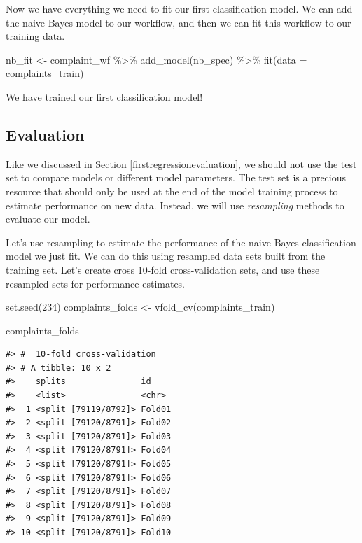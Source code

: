 \documentclass[
]{krantz}
\makeatletter
\newenvironment{Shaded}{\begin{snugshade}}{\end{snugshade}}
\newcommand{\AttributeTok}[1]{\textcolor[rgb]{0.77,0.63,0.00}{#1}}
\newcommand{\DecValTok}[1]{\textcolor[rgb]{0.00,0.00,0.81}{#1}}
\newcommand{\FunctionTok}[1]{\textcolor[rgb]{0.00,0.00,0.00}{#1}}
\newcommand{\NormalTok}[1]{#1}
\newcommand{\OtherTok}[1]{\textcolor[rgb]{0.56,0.35,0.01}{#1}}
\newcommand{\SpecialCharTok}[1]{\textcolor[rgb]{0.00,0.00,0.00}{#1}}
\newenvironment{kframe}{%
\medskip{}
\setlength{\fboxsep}{.8em}
 \def\at@end@of@kframe{}%
 \ifinner\ifhmode%
  \def\at@end@of@kframe{\end{minipage}}%
  \begin{minipage}{\columnwidth}%
 \fi\fi%
 \def\FrameCommand##1{\hskip\@totalleftmargin \hskip-\fboxsep
 \colorbox{shadecolor}{##1}\hskip-\fboxsep
     \hskip-\linewidth \hskip-\@totalleftmargin \hskip\columnwidth}%
 \MakeFramed {\advance\hsize-\width
   \@totalleftmargin\z@ \linewidth\hsize
   \@setminipage}}%
 {\par\unskip\endMakeFramed%
 \at@end@of@kframe}
\renewenvironment{Shaded}{\begin{kframe}}{\end{kframe}}
\makeatother
\begin{document}
Now we have everything we need to fit our first classification model. We can add the naive Bayes model to our workflow, and then we can fit this workflow to our training data.

\begin{Shaded}
\begin{Highlighting}[]
\NormalTok{nb\_fit }\OtherTok{\textless{}{-}}\NormalTok{ complaint\_wf }\SpecialCharTok{\%\textgreater{}\%}
  \FunctionTok{add\_model}\NormalTok{(nb\_spec) }\SpecialCharTok{\%\textgreater{}\%}
  \FunctionTok{fit}\NormalTok{(}\AttributeTok{data =}\NormalTok{ complaints\_train)}
\end{Highlighting}
\end{Shaded}

We have trained our first classification model!

\hypertarget{evaluation}{%
\subsection{Evaluation}\label{evaluation}}

Like we discussed in Section \ref{firstregressionevaluation}, we should not use the test set to compare models or different model parameters. The test set is a precious resource that should only be used at the end of the model training process to estimate performance on new data. Instead, we will use \emph{resampling} methods to evaluate our model.

Let's use resampling to estimate the performance of the naive Bayes classification model we just fit. We can do this using resampled data sets built from the training set. Let's create cross 10-fold cross-validation sets, and use these resampled sets for performance estimates.

\begin{Shaded}
\begin{Highlighting}[]
\FunctionTok{set.seed}\NormalTok{(}\DecValTok{234}\NormalTok{)}
\NormalTok{complaints\_folds }\OtherTok{\textless{}{-}} \FunctionTok{vfold\_cv}\NormalTok{(complaints\_train)}

\NormalTok{complaints\_folds}
\end{Highlighting}
\end{Shaded}

\begin{verbatim}
#> #  10-fold cross-validation 
#> # A tibble: 10 x 2
#>    splits               id    
#>    <list>               <chr> 
#>  1 <split [79119/8792]> Fold01
#>  2 <split [79120/8791]> Fold02
#>  3 <split [79120/8791]> Fold03
#>  4 <split [79120/8791]> Fold04
#>  5 <split [79120/8791]> Fold05
#>  6 <split [79120/8791]> Fold06
#>  7 <split [79120/8791]> Fold07
#>  8 <split [79120/8791]> Fold08
#>  9 <split [79120/8791]> Fold09
#> 10 <split [79120/8791]> Fold10
\end{verbatim}
\end{document}
